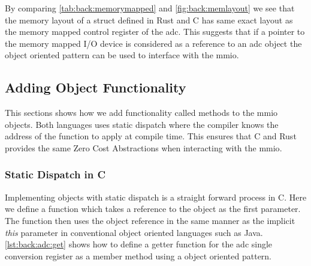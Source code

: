By comparing \autoref{tab:back:memorymapped} and \autoref{fig:back:memlayout} we see that the memory layout of a struct defined in Rust and C has same exact layout as the memory mapped control register of the \gls{adc}.
This suggests that if a pointer to the memory mapped I/O device is considered as a reference to an \gls{adc} object the object oriented pattern can be used to interface with the \gls{mmio}.

\subsection{Adding Object Functionality}

This sections shows how we add functionality called methods to the \gls{mmio} objects.
Both languages uses static dispatch where the compiler knows the address of the function to apply at compile time.
This ensures that C and Rust provides the same Zero Cost Abstractions when interacting with the \gls{mmio}.

\subsubsection{Static Dispatch in C}

Implementing objects with static dispatch is a straight forward process in C.
Here we define a function which takes a reference to the object as the first parameter.
The function then uses the object reference in the same manner as the implicit \emph{this} parameter in conventional object oriented languages such as Java.
\autoref{lst:back:adc:get} shows how to define a getter function for the \gls{adc} single conversion register as a member method using a object oriented pattern.

